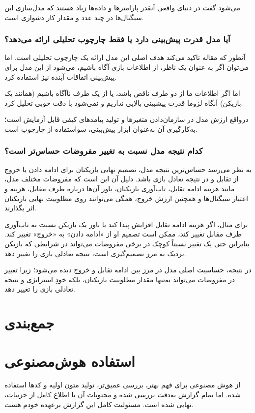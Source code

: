 \documentclass[12pt]{article}
\begin{document}
می‌شود گفت در دنیای واقعی آنقدر پارامترها و داده‌ها زیاد هستند که مدل‌سازی
این سیگنال‌ها در چند عدد و مقدار کار دشواری است.

\subsubsection*{آیا مدل قدرت پیش‌بینی دارد یا فقط چارچوب تحلیلی ارائه می‌دهد؟}
آنطور که مقاله تاکید می‌کند هدف اصلی این مدل ارائه یک چارچوب تحلیلی است.
اما می‌توان اگر به عنوان یک ناظر، از اطلاعات بازی آگاه باشیم، می‌شود از
این مدل برای پیش‌بینی اتفاقات آینده نیز استفاده کرد.

اما اگر اطلاعات ما از دو طرف ناقص باشد، یا از یک طرف ناآگاه باشیم
(همانند یک بازیکن)
آنگاه لزوما قدرت پیشبینی بالایی نداریم و نمی‌شود با دقت خوبی 
تحلیل کرد.

درواقع
ارزش مدل در سازمان‌دادن متغیرها و تولید پیامدهای کیفی قابل آزمایش است؛
به‌کارگیری آن به‌عنوان ابزار پیش‌بینی، سواستفاده از چارچوب است.

\subsubsection*{کدام نتیجه مدل نسبت به تغییر مفروضات حساس‌تر است؟}

به نظر می‌رسد حساس‌ترین نتیجه مدل، تصمیم نهایی بازیکنان برای ادامه دادن یا
 خروج از تقابل و در نتیجه تعادل بازی باشد. دلیل آن این است که
 مفروضات مختلف مدل، مانند هزینه ادامه تقابل، تاب‌آوری بازیکنان، 
باور آن‌ها درباره طرف مقابل، هزینه و اعتبار سیگنال‌ها و همچنین
 ارزش خروج، همگی می‌توانند روی مطلوبیت نهایی بازیکنان اثر بگذارند.

برای مثال، اگر هزینه ادامه
 تقابل افزایش پیدا کند یا باور یک بازیکن نسبت به تاب‌آوری طرف مقابل
 تغییر کند، ممکن است تصمیم او از «ادامه دادن» به «خروج» تغییر کند.
 بنابراین حتی یک تغییر نسبتاً کوچک در برخی مفروضات می‌تواند در شرایطی که
 بازیکن نزدیک به مرز تصمیم‌گیری است، نتیجه تعادلی بازی را تغییر دهد.

در نتیجه، حساسیت اصلی مدل در مرز بین ادامه تقابل و خروج
 دیده می‌شود؛ زیرا تغییر در مفروضات می‌تواند نه‌تنها مقدار 
مطلوبیت بازیکنان، بلکه خودِ استراتژی و نتیجه تعادلی بازی را تغییر دهد.

\section{جمع‌بندی}

\section*{استفاده هوش‌مصنوعی}
از هوش مصنوعی برای فهم بهتر، بررسی عمیق‌تر، تولید متون اولیه و کدها استفاده شده.
اما تمام گزارش به‌دقت بررسی شده و محتویات آن با اطلاع کامل
از جزییات، نهایی شده است.
 مسئولیت کامل این گزارش برعهده خودم هست.
\end{document}
